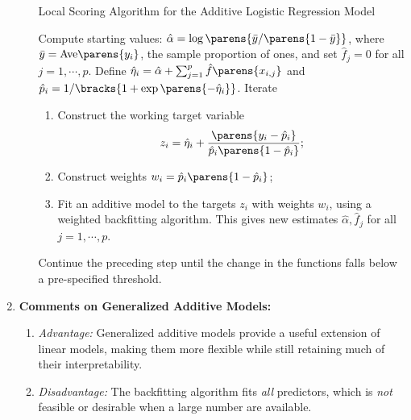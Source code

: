 \documentclass[12pt]{article}
\begin{document}
\begin{enumerate}[label=\textbf{\arabic*.}]
\begin{enumerate}
		\begin{minipage}{\linewidth}
			\begin{algorithm}[H]
				\caption{Local Scoring Algorithm for the Additive Logistic Regression Model}\label{algo-backfit-logistic}
				\begin{algorithmic}[1]
				
				\STATE Compute starting values: $\hat{\alpha} = \log \parens{\bar{y} / \parens{1 - \bar{y}}}$, where $\bar{y} = \mathrm{Ave} \parens{y_i}$, the sample proportion of ones, and set $\hat{f}_j = 0$ for all $j = 1, \cdots, p$. 
				\STATE Define $\hat{\eta}_i = \hat{\alpha} + \sum_{j=1}^p \hat{f} \parens{x_{i,j}}$ and $\hat{p}_i = 1 / \bracks{ 1 + \exp \parens{ - \hat{\eta}_i }}$. Iterate 
				\begin{enumerate}
					\item Construct the working target variable 
					\begin{align*}
						z_i = \hat{\eta}_i + \frac{\parens{y_i - \hat{p}_i}}{\hat{p}_i \parens{1 - \hat{p}_i}}; 
					\end{align*}
					\item Construct weights $w_i = \hat{p}_i \parens{1 - \hat{p}_i}$; 
					\item Fit an additive model to the targets $z_i$ with weights $w_i$, using a weighted backfitting algorithm. This gives new estimates $\hat{\alpha}, \hat{f}_j$ for all $j = 1, \cdots, p$. 
				\end{enumerate}
				\STATE Continue the preceding step until the change in the functions falls below a pre-specified threshold. 
				\end{algorithmic}
			\end{algorithm}
		\end{minipage}
	\end{enumerate}
	
	\item \textbf{Comments on Generalized Additive Models:} 
	\begin{enumerate}
		\item \textit{Advantage:} Generalized additive models provide a useful extension of linear models, making them more flexible while still retaining much of their interpretability. 
		\item \textit{Disadvantage:} The backfitting algorithm fits \emph{all} predictors, which is \emph{not} feasible or desirable when a large number are available. 
	\end{enumerate}

\end{enumerate}
\end{document}
